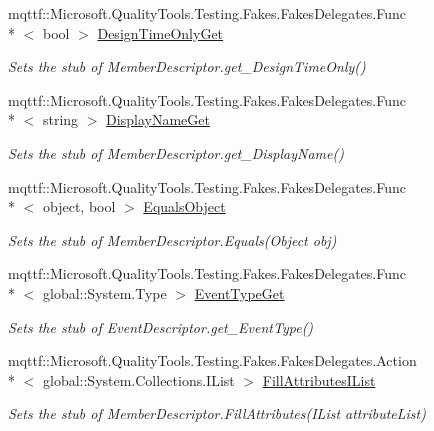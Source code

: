 \begin{DoxyCompactItemize}
mqttf\-::\-Microsoft.\-Quality\-Tools.\-Testing.\-Fakes.\-Fakes\-Delegates.\-Func\\*
$<$ bool $>$ \hyperlink{class_system_1_1_component_model_1_1_fakes_1_1_stub_event_descriptor_a7af5c913233ad241cc71453011750d48}{Design\-Time\-Only\-Get}
\begin{DoxyCompactList}\small\item\em Sets the stub of Member\-Descriptor.\-get\-\_\-\-Design\-Time\-Only()\end{DoxyCompactList}\item 
mqttf\-::\-Microsoft.\-Quality\-Tools.\-Testing.\-Fakes.\-Fakes\-Delegates.\-Func\\*
$<$ string $>$ \hyperlink{class_system_1_1_component_model_1_1_fakes_1_1_stub_event_descriptor_a47742a4c77d30b5db7996fd1f7bdcb6c}{Display\-Name\-Get}
\begin{DoxyCompactList}\small\item\em Sets the stub of Member\-Descriptor.\-get\-\_\-\-Display\-Name()\end{DoxyCompactList}\item 
mqttf\-::\-Microsoft.\-Quality\-Tools.\-Testing.\-Fakes.\-Fakes\-Delegates.\-Func\\*
$<$ object, bool $>$ \hyperlink{class_system_1_1_component_model_1_1_fakes_1_1_stub_event_descriptor_a16ce9b1d72559df56a164fc73ef34ea2}{Equals\-Object}
\begin{DoxyCompactList}\small\item\em Sets the stub of Member\-Descriptor.\-Equals(\-Object obj)\end{DoxyCompactList}\item 
mqttf\-::\-Microsoft.\-Quality\-Tools.\-Testing.\-Fakes.\-Fakes\-Delegates.\-Func\\*
$<$ global\-::\-System.\-Type $>$ \hyperlink{class_system_1_1_component_model_1_1_fakes_1_1_stub_event_descriptor_a2b4f35ed7f5cd94fb61f93766db9c962}{Event\-Type\-Get}
\begin{DoxyCompactList}\small\item\em Sets the stub of Event\-Descriptor.\-get\-\_\-\-Event\-Type()\end{DoxyCompactList}\item 
mqttf\-::\-Microsoft.\-Quality\-Tools.\-Testing.\-Fakes.\-Fakes\-Delegates.\-Action\\*
$<$ global\-::\-System.\-Collections.\-I\-List $>$ \hyperlink{class_system_1_1_component_model_1_1_fakes_1_1_stub_event_descriptor_ac464952155264fc6a046a93ff4ecb6e6}{Fill\-Attributes\-I\-List}
\begin{DoxyCompactList}\small\item\em Sets the stub of Member\-Descriptor.\-Fill\-Attributes(\-I\-List attribute\-List)\end{DoxyCompactList}\item 

\end{DoxyCompactItemize}
